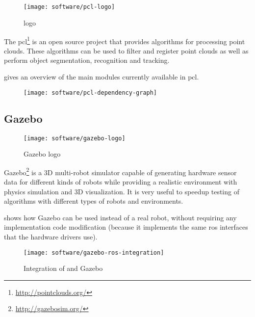 \subsection{}

\begin{wrapfigure}{r}{0.25\textwidth}
	\centering
	\texttt{[image: software/pcl-logo]}
	\caption{ logo}
	\label{pcl-logo}
\end{wrapfigure}

The \gls{pcl}\footnote{\url{http://pointclouds.org/}} \cite{Rusu2011} is an open source project that provides algorithms for processing point clouds. These algorithms can be used to filter and register point clouds as well as perform object segmentation, recognition and tracking.

 gives an overview of the main modules currently available in \gls{pcl}.

\begin{figure}[H]
	\centering
	\texttt{[image: software/pcl-dependency-graph]}
	\caption[]{\protect\footnotemark}
	\label{fig:pcl-dependency-graph}
\end{figure}


\subsection{Gazebo}

\begin{wrapfigure}{r}{0.25\textwidth}
	\centering
	\texttt{[image: software/gazebo-logo]}
	\caption{Gazebo logo}
	\label{fig:gazebo-logo}
\end{wrapfigure}


Gazebo\footnote{\url{http://gazebosim.org/}} is a 3D multi-robot simulator capable of generating hardware sensor data for different kinds of robots while providing a realistic environment with physics simulation and 3D visualization. It is very useful to speedup testing of algorithms with different types of robots and environments.

 shows how Gazebo can be used instead of a real robot, without requiring any implementation code modification (because it implements the same \gls{ros} interfaces that the hardware drivers use).

\begin{figure}[H]
	\centering
	\texttt{[image: software/gazebo-ros-integration]}
	\caption[Integration of  and Gazebo]{Integration of  and Gazebo\protect\footnotemark}
	\label{fig:gazebo-ros-integration}
\end{figure}


